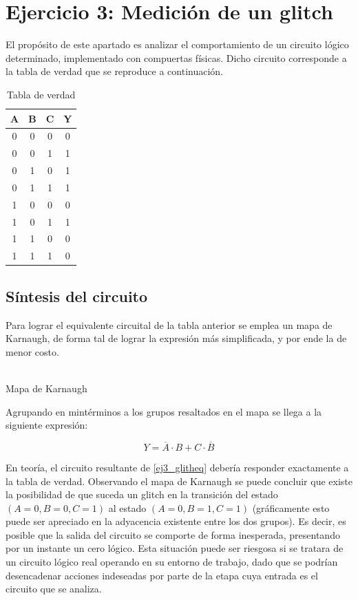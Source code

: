 \section{Ejercicio 3: Medici\'on de un glitch}

El prop\'osito de este apartado es analizar el comportamiento de un circuito l\'ogico determinado, implementado con compuertas f\'isicas. Dicho circuito corresponde a la tabla de verdad que se reproduce a continuaci\'on.

\begin{table}[H]
\centering
\caption{Tabla de verdad}
\label{tab:ej3_tabla_verdad}
\begin{tabular}{ccc|c}
A & B & C & Y \\ \hline
0 & 0 & 0 & 0 \\
0 & 0 & 1 & 1 \\
0 & 1 & 0 & 1 \\
0 & 1 & 1 & 1 \\
1 & 0 & 0 & 0 \\
1 & 0 & 1 & 1 \\
1 & 1 & 0 & 0 \\
1 & 1 & 1 & 0
\end{tabular}
\end{table}

\subsection{S\'intesis del circuito}
Para lograr el equivalente circuital de la tabla anterior se emplea un mapa de Karnaugh, de forma tal de lograr la expresi\'on m\'as simplificada, y por ende la de menor costo.

\begin{center}
    \begin{Karnaughvuit}
        \label{Karnaugh_glitch}
	\end{Karnaughvuit}\\
Mapa de Karnaugh
\end{center}


Agrupando en mint\'erminos a los grupos resaltados en el mapa se llega a la siguiente expresi\'on:

\begin{equation}
\label{ej3_glitheq}
 Y = \overline{A}\cdot B + C \cdot \overline{B}
\end{equation}

En teor\'ia, el circuito resultante de \ref{ej3_glitheq} deber\'ia responder exactamente a la tabla de verdad. Observando el mapa de Karnaugh se puede concluir que existe la posibilidad de que suceda un glitch en la transici\'on del estado $(A = 0, B = 0, C = 1)$ al estado $(A = 0, B = 1, C = 1)$ (gr\'aficamente esto puede ser apreciado en la adyacencia existente entre los dos grupos). Es decir, es posible que la salida del circuito se comporte de forma inesperada, presentando por un instante un cero l\'ogico. Esta situaci\'on puede ser riesgosa si se tratara de un circuito l\'ogico real operando en su entorno de trabajo, dado que se podr\'ian desencadenar acciones indeseadas por parte de la etapa cuya entrada es el circuito que se analiza.

